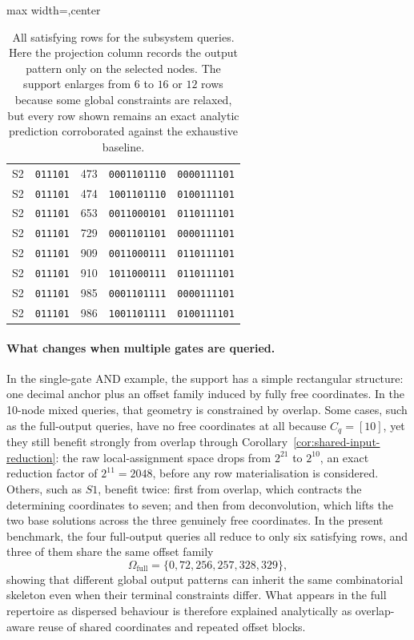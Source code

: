 \documentclass[11pt]{article}
\theoremstyle{definition}
\begin{document}
\begin{table}[H]
\begin{adjustbox}{max width=\textwidth,center}
\begin{tabular}{@{}lcrcc@{}}
S2 & \texttt{011101} & 473 & \texttt{0001101110} & \texttt{0000111101} \\
S2 & \texttt{011101} & 474 & \texttt{1001101110} & \texttt{0100111101} \\
S2 & \texttt{011101} & 653 & \texttt{0011000101} & \texttt{0110111101} \\
S2 & \texttt{011101} & 729 & \texttt{0001101101} & \texttt{0000111101} \\
S2 & \texttt{011101} & 909 & \texttt{0011000111} & \texttt{0110111101} \\
S2 & \texttt{011101} & 910 & \texttt{1011000111} & \texttt{0110111101} \\
S2 & \texttt{011101} & 985 & \texttt{0001101111} & \texttt{0000111101} \\
S2 & \texttt{011101} & 986 & \texttt{1001101111} & \texttt{0100111101} \\
\bottomrule
\end{tabular}
\end{adjustbox}
\caption{All satisfying rows for the subsystem queries. Here the projection column records the output pattern only on the selected nodes. The support enlarges from \(6\) to \(16\) or \(12\) rows because some global constraints are relaxed, but every row shown remains an exact analytic prediction corroborated against the exhaustive baseline.}
\label{tab:mixed10-subsystem-rows}
\end{table}

\paragraph{What changes when multiple gates are queried.}
In the single-gate AND example, the support has a simple rectangular structure: one decimal anchor plus an offset family induced by fully free coordinates. In the 10-node mixed queries, that geometry is constrained by overlap. Some cases, such as the full-output queries, have no free coordinates at all because \(C_q=[10]\), yet they still benefit strongly from overlap through Corollary~\ref{cor:shared-input-reduction}: the raw local-assignment space drops from \(2^{21}\) to \(2^{10}\), an exact reduction factor of \(2^{11}=2048\), before any row materialisation is considered. Others, such as \(S1\), benefit twice: first from overlap, which contracts the determining coordinates to seven; and then from deconvolution, which lifts the two base solutions across the three genuinely free coordinates. In the present benchmark, the four full-output queries all reduce to only six satisfying rows, and three of them share the same offset family
\[
\Omega_{\mathrm{full}}=\{0,72,256,257,328,329\},
\]
showing that different global output patterns can inherit the same combinatorial skeleton even when their terminal constraints differ. What appears in the full repertoire as dispersed behaviour is therefore explained analytically as overlap-aware reuse of shared coordinates and repeated offset blocks.
\end{document}
